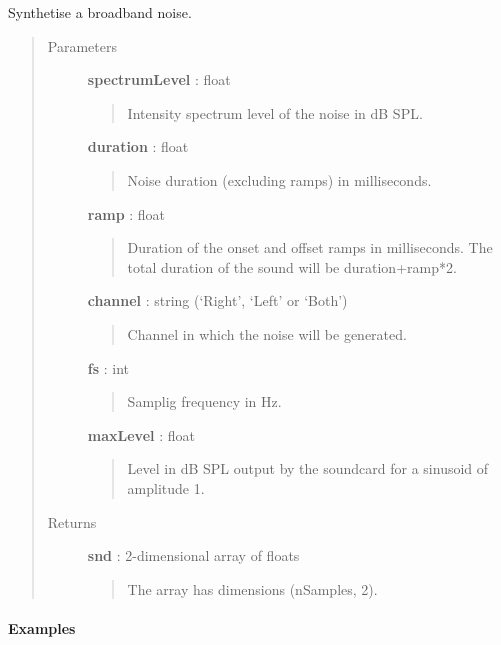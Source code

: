 \documentclass[a4paper,12pt,english]{sphinxmanual}
\begin{document}
\begin{fulllineitems}
\label{sndlib:sndlib.broadbandNoise}
Synthetise a broadband noise.
\begin{quote}\begin{description}
\item[{Parameters }] \leavevmode
\textbf{spectrumLevel} : float
\begin{quote}

Intensity spectrum level of the noise in dB SPL.
\end{quote}

\textbf{duration} : float
\begin{quote}

Noise duration (excluding ramps) in milliseconds.
\end{quote}

\textbf{ramp} : float
\begin{quote}

Duration of the onset and offset ramps in milliseconds.
The total duration of the sound will be duration+ramp*2.
\end{quote}

\textbf{channel} : string (`Right', `Left' or `Both')
\begin{quote}

Channel in which the noise will be generated.
\end{quote}

\textbf{fs} : int
\begin{quote}

Samplig frequency in Hz.
\end{quote}

\textbf{maxLevel} : float
\begin{quote}

Level in dB SPL output by the soundcard for a sinusoid of amplitude 1.
\end{quote}

\item[{Returns }] \leavevmode
\textbf{snd} : 2-dimensional array of floats
\begin{quote}

The array has dimensions (nSamples, 2).
\end{quote}

\end{description}\end{quote}
\paragraph{Examples}


\end{fulllineitems}
\end{document}
